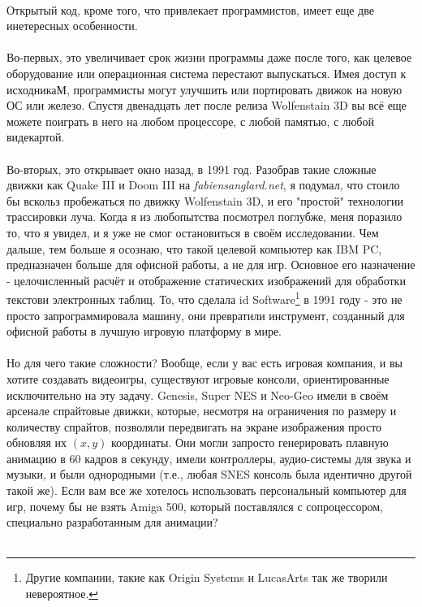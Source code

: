 \\
Открытый код, кроме того, что привлекает программистов, имеет еще две инетересных особенности.\\
\\
Во-первых, это увеличивает срок жизни программы даже после того, как целевое оборудование или операционная система перестают выпускаться. Имея доступ к исходникаМ, программисты могут улучшить или портировать движок на новую ОС или железо. Спустя двенадцать лет после релиза Wolfenstain 3D вы всё еще можете поиграть в него на любом процессоре, с любой памятью, с любой видекартой.\\
\\
Во-вторых, это открывает окно назад, в 1991 год. Разобрав такие сложные движки как Quake III и Doom III на \emph{fabiensanglard.net}, я подумал, что стоило бы вскольз пробежаться по движку Wolfenstain 3D, и его "простой" технологии трассировки луча. Когда я из любопытства посмотрел поглубже, меня поразило то, что я увидел, и я уже не смог остановиться в своём исследовании. Чем дальше, тем больше я осознаю, что такой целевой компьютер как IBM PC, предназначен больше для офисной работы, а не для игр. Основное его назначение - целочисленный расчёт и отображение статических изображений для обработки текстови электронных таблиц.
То, что сделала id Software\footnote{Другие компании, такие как Origin Systems и LucasArts так же творили невероятное.} в 1991 году - это не просто запрограммировала машину, они превратили инструмент, созданный для офисной работы в лучшую игровую платформу в мире.\\
\\
Но для чего такие сложности? Вообще, если у вас есть игровая компания, и вы хотите создавать видеоигры, существуют игровые консоли, ориентированные исключительно на эту задачу. Genesis, Super NES и Neo-Geo имели в своём арсенале спрайтовые движки\label{sprite_engine_ref}, которые, несмотря на ограничения по размеру и количеству спрайтов, позволяли передвигать на экране изображения просто обновляя их $(x,y)$ координаты. Они могли запросто генерировать плавную анимацию в 60 кадров в секунду, имели контроллеры, аудио-системы для звука и музыки, и были однородными (т.е., любая SNES консоль была идентично другой такой же). Если вам все же хотелось использовать персональный компьютер для игр, почему бы не взять Amiga 500, который поставлялся с сопроцессором, специально разработанным для анимации?\\
\\
